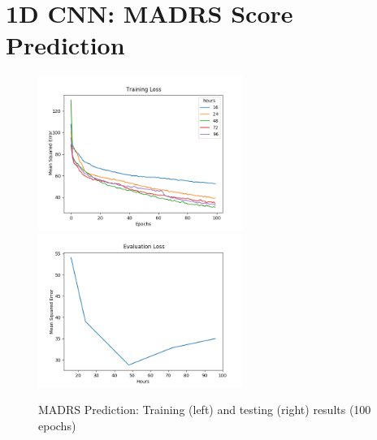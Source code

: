 \section{1D CNN: MADRS Score Prediction}

\begin{figure}
      \begin{multicols}{2}
            \includegraphics[height=5cm]{img/madrs_prediction/plot_loss_train.png}
            \includegraphics[height=5cm]{img/madrs_prediction/plot_loss_eval.png}
      \end{multicols}
      \caption{MADRS Prediction: Training (left) and testing (right) results (100 epochs)}
      \label{figure:madrs_prediction_50e}
\end{figure}

